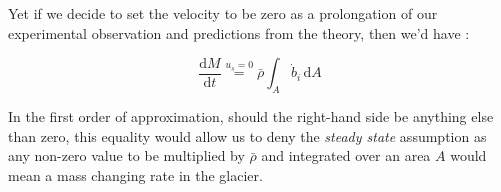 Yet if we decide to set the velocity to be zero as a prolongation of our experimental observation and predictions from the theory, then we'd have :

\begin{equation} \boxed{\frac{\mathrm{d} M}{\mathrm{d}t} \stackrel{u_s = 0}{=} \bar{\rho} \int_A \dot{b}_i \, \mathrm{d}A} \end{equation}

In the first order of approximation, should the right-hand side be anything else than zero, this equality would allow us to deny the \textit{steady state} assumption as any non-zero value to be multiplied by $\bar{\rho}$ and integrated over an area $A$ would mean a mass changing rate in the glacier.